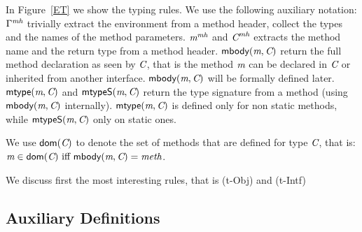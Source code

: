 In Figure~\ref{ET} we show the typing rules.
We use the following auxiliary notation:
$\Gamma^\textit{mh}$ trivially extract the environment from a method header, collect the types and the names of the method parameters.
$\textit{m}^\textit{mh}$ and $\textit{C}^\textit{mh}$ extracts the method name and the return type from a method header.
$\textsf{mbody}(\textit{m},\textit{C})$ return the full method declaration as seen by $\textit{C}$, that is the method $\textit{m}$ can be declared in $\textit{C}$ or inherited from another interface.
$\textsf{mbody}(\textit{m},\textit{C})$ will be formally defined later.
$\textsf{mtype}(\textit{m},\textit{C})$ and
$\textsf{mtypeS}(\textit{m},\textit{C})$ return the type signature from a method (using $\textsf{mbody}(\textit{m},\textit{C})$ internally).
$\textsf{mtype}(\textit{m},\textit{C})$ is defined only for non static methods, while
$\textsf{mtypeS}(\textit{m},\textit{C})$ only on static ones.

We use $\textsf{dom}(\textit{C})$ to denote the set of methods that are defined for type $\textit{C}$, that is: $\m\in\dom(\C)\ \miff \ \mBody(\m,\C)=\method$.

We discuss first the most interesting rules, that is
(t-Obj) and  (t-Intf) 




\subsection{Auxiliary Definitions}

